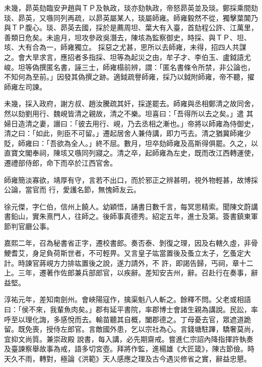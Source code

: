 \begin{pinyinscope}
 未幾，昴英劾臨安尹趙與ＴＰ及執政，琰亦劾執政，帝怒昴英並及琰。鄭採乘間劾琰、昴英，又嗾同列再疏，以昴英屬某人，琰屬師雍。師雍毅然不從，獨擊葉閶乃與ＴＰ腹心。琰、昴英去國，採於是薦周坦、葉大有入臺，首劾程公許、江萬里，善類日危矣。未逾月，坦攻參政吳潛去，陳垓為監察御史，時採、與ＴＰ、坦、垓、大有合為一，師雍獨立。
 採惡之尤甚，思所以去師雍，未得，招四人共謀之。會大旱求言，應招者多指採、坦等為起災之由，牟子才、李伯玉、盧鉞語尤峻。坦等偽撰匿名書，誣三士，師雍榻前辨，謂：「匿名書條令所禁，非公論也，不知何為至前。」因發其偽撰之跡。適鉞疏譽師雍，採乃以鉞附師雍，帝不聽，擢師雍左司諫。



 未幾，採入政府，謝方叔、趙汝騰疏其奸，採遂罷去。師雍與丞相鄭清之故同舍，然以劾劉用行、魏峴皆清之親故，清之不樂。坦喜曰：「吾得所以去之矣。」遣
 其婦日造清之妻，譖曰：「彼去用行、峴，乃去丞相之漸也。」帝將以師雍為侍御史，清之曰：「如此，則臣不可留。」遷起居舍人兼侍講，即力丐去。清之猶冀師雍少貶，師雍曰：「吾欲為全人。」終不屈。數月，坦卒劾師雍及高斯得俱罷。久之，以直寶文閣奉祠，陳垓又嗾同列寢之。清之卒，起師雍為左史，既而改江西轉運使，遷禮部侍郎，命下而卒於江西官舍。



 師雍簡淡寡欲，靖厚有守，言若不出口，而於邪正之辨甚明，視外物輕甚，故博採公論，當官而
 行，愛護名節，無愧師友云。



 徐元傑，字仁伯，信州上饒人。幼穎悟，誦書日數千言，每冥思精索。聞陳文蔚講書鉛山，實朱熹門人，往師之。後師事真德秀。紹定五年，進士及第。簽書鎮東軍節判官廳公事。



 嘉熙二年，召為秘書省正字，遷校書郎。奏否泰、剝復之理，因及右轄久虛，非骨鯁耆艾，身足負荷斯世者，不可輕畀。又言皇子竑當置後及蚤立太子，乞蚤定大計。時諫官蔣峴方力排竑置後之說，遂力請外，不
 許，即謁告歸，丐祠，章十二上。三年，遷著作佐郎兼兵部郎官，以疾辭。差知安吉州，辭。召赴行在奏事，辭益堅。



 淳祐元年，差知南劍州。會峽陽寇作，擒渠魁八人斬之。餘釋不問。父老或相語曰：「侯不來，我輩魚肉矣。」郡有延平書院，率郡博士會諸生親為講說。民訟，率呼至以理化誨，多感悅而去。輸苗聽其自概，闔郡德之。丁母憂去官，眾遮道跪留。既免喪，授侍左郎官。言敵國外患，乞以宗社為心。言錢塘駐蹕，驕奢莫尚，宜抑文尚質。兼崇政殿
 說書，每入講，必先期齋戒。嘗進仁宗詔內降指揮許執奏及臺諫察舉故事為戒，語多切宮壺。拜將作監，進楊雄《大匠箴》，陳古節儉。時天久不雨，轉對，極論《洪範》天人感應之理及古今遇災修省之實，辭益忠懇。




\end{pinyinscope}
